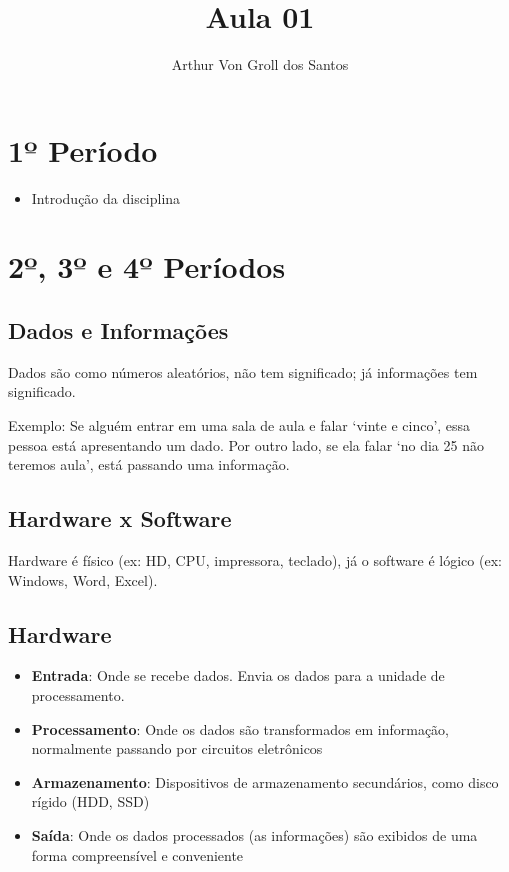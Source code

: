 \documentclass{article}
\author{Arthur Von Groll dos Santos}
\title{Aula 01}
\begin{document}
\maketitle

\section*{\centering 1º Período}

\begin{itemize}
    \item Introdução da disciplina
\end{itemize}

\section*{\centering 2º, 3º e 4º Períodos}

\subsection*{\centering Dados e Informações}

Dados são como números aleatórios, não tem significado; já informações tem significado.

Exemplo: Se alguém entrar em uma sala de aula e falar `vinte e cinco', essa pessoa está apresentando
um dado. Por outro lado, se ela falar `no dia 25 não teremos aula', está passando uma informação.

\subsection*{\centering Hardware x Software}

Hardware é físico (ex: HD, CPU, impressora, teclado), já o software é lógico (ex: Windows, Word, Excel).

\subsection*{\centering Hardware}
\begin{itemize}
    \item \textbf{Entrada}: Onde se recebe dados. Envia os dados para a unidade de 
        processamento.
    \item \textbf{Processamento}: Onde os dados são transformados em informação, normalmente
        passando por circuitos eletrônicos
    \item \textbf{Armazenamento}: Dispositivos de armazenamento secundários, como 
        disco rígido (HDD, SSD)
    \item \textbf{Saída}: Onde os dados processados (as informações) são exibidos 
        de uma forma compreensível e conveniente
\end{itemize}
\end{document}
